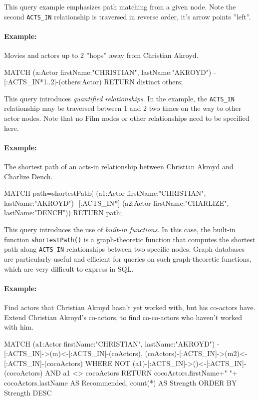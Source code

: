 This query example emphasizes path matching from a given node. Note the second \texttt{ACTS\_IN} relationship is traversed in reverse order, it's arrow points ''left''.

\paragraph*{Example:} Movies and actors up to 2 ''hops'' away from Christian Akroyd.

\begin{cyphercode}
MATCH (a:Actor {firstName:"CHRISTIAN", lastName:"AKROYD"})
      -[:ACTS_IN*1..2]-(others:Actor) 
RETURN distinct others;
\end{cyphercode}

This query introduces \emph{quantified relationships}. In the example, the \texttt{ACTS\_IN} relationship may be traversed between 1 and 2 two times on the way to other actor nodes. Note that no Film nodes or other relationships need to be specified here.

\paragraph*{Example:} The shortest path of an acts-in relationship between Christian Akroyd and Charlize Dench.

\begin{cyphercode}
MATCH path=shortestPath( 
  (a1:Actor {firstName:"CHRISTIAN", lastName:"AKROYD"}) 
  -[:ACTS_IN*]-(a2:Actor {firstName:"CHARLIZE", lastName:"DENCH"})) 
RETURN path;
\end{cyphercode}

This query introduces the use of \emph{built-in functions}. In this case, the built-in function \texttt{shortestPath()} is a graph-theoretic function that computes the shortest path along \texttt{ACTS\_IN} relationships between two specific nodes. Graph databases are particularly useful and efficient for queries on such graph-theoretic functions, which are very difficult to express in SQL.

\paragraph*{Example:} Find actors that Christian Akroyd hasn't yet worked with, but his co-actors have. Extend Christian Akroyd's co-actors, to find co-co-actors who haven't worked with him.

\begin{cyphercode}
MATCH (a1:Actor {firstName:"CHRISTIAN", lastName:"AKROYD"})
         -[:ACTS_IN]->(m)<-[:ACTS_IN]-(coActors),
      (coActors)-[:ACTS_IN]->(m2)<-[:ACTS_IN]-(cocoActors)
WHERE NOT (a1)-[:ACTS_IN]->()<-[:ACTS_IN]-(cocoActors) 
      AND a1 <> cocoActors
RETURN cocoActors.firstName+" "+
       cocoActors.lastName AS Recommended, 
       count(*) AS Strength 
ORDER BY Strength DESC
\end{cyphercode}

